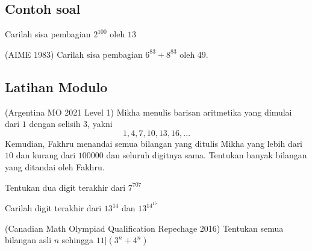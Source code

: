 \documentclass[11pt]{scrartcl}
\begin{document}
\subsection{Contoh soal}
\begin{problem}
    Carilah sisa pembagian $2^{100}$ oleh $13$
\end{problem}

\begin{problem}
    (AIME 1983) Carilah sisa pembagian $6^{83} + 8^{83}$ oleh 49.    
\end{problem}

\subsection{Latihan Modulo}
\begin{problem}
    (Argentina MO 2021 Level 1) Mikha menulis barisan aritmetika yang dimulai dari $1$ dengan selisih $3$, yakni $$1, 4, 7, 10, 13, 16, ...$$ Kemudian, Fakhru menandai semua bilangan yang ditulis Mikha yang lebih dari $10$ dan kurang dari $100000$ dan seluruh digitnya sama. Tentukan banyak bilangan yang ditandai oleh Fakhru.
\end{problem}

\begin{problem}
    Tentukan dua digit terakhir dari $7^{707}$
\end{problem}

\begin{problem}
    Carilah digit terakhir dari $13^{14}$ dan $13^{14^{15}}$
\end{problem}

\begin{problem}
    (Canadian Math Olympiad Qualification Repechage 2016) Tentukan semua bilangan asli $n$ sehingga $11|(3^n + 4^n)$
\end{problem}

\end{document}
